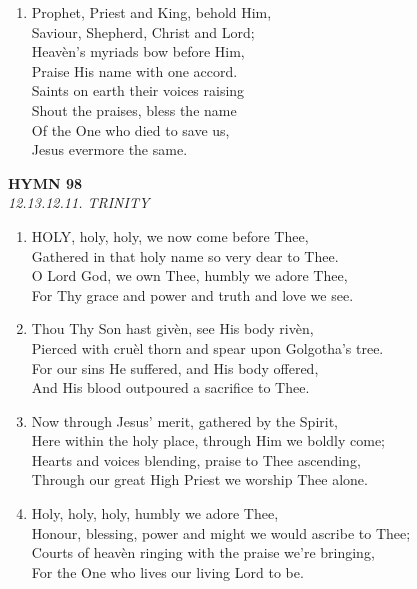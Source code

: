 \begin{enumerate}
    \item Prophet, Priest and King, behold Him, \\
        Saviour, Shepherd, Christ and Lord; \\
        Heav\`en's myriads bow before Him, \\
        Praise His name with one accord. \\
        Saints on earth their voices raising \\
        Shout the praises, bless the name \\
        Of the One who died to save us, \\
        Jesus evermore the same.

\end{enumerate}

\newpage
\begin{center}
    {\Large \textbf{HYMN 98\textdagger{}}}
    \\
    \textit{12.13.12.11. TRINITY}
\end{center}
\vspace{1em}

\begin{enumerate}
    \item HOLY, holy, holy, we now come before Thee, \\
        Gathered in that holy name so very dear to Thee. \\
        O Lord God, we own Thee, humbly we adore Thee, \\
        For Thy grace and power and truth and love we see.

    \item Thou Thy Son hast giv\`en, see His body riv\`en, \\
        Pierced with cru\`el thorn and spear upon Golgotha's tree. \\
        For our sins He suffered, and His body offered, \\
        And His blood outpoured a sacrifice to Thee.

    \item Now through Jesus' merit, gathered by the Spirit, \\
        Here within the holy place, through Him we boldly come; \\
        Hearts and voices blending, praise to Thee ascending, \\
        Through our great High Priest we worship Thee alone.

    \item Holy, holy, holy, humbly we adore Thee, \\
        Honour, blessing, power and might we would ascribe to Thee; \\
        Courts of heav\`en ringing with the praise we're bringing, \\
        For the One who lives our living Lord to be.

\end{enumerate}

